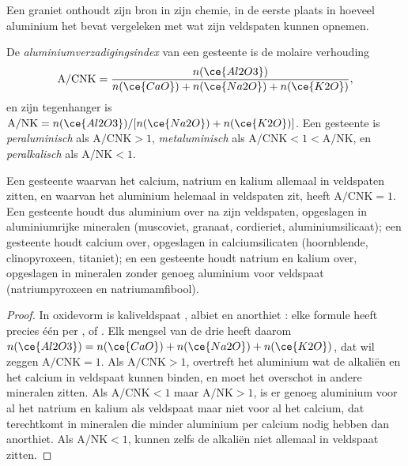 Een graniet onthoudt zijn bron in zijn chemie, in de eerste plaats in hoeveel aluminium het
bevat vergeleken met wat zijn veldspaten kunnen opnemen.

\begin{definition}[Aluminiumverzadigingsindex]\label{def:b2:crustal-melting:asi}
De \emph{aluminiumverzadigingsindex} van een gesteente is de
molaire verhouding
\[\mathrm{A/CNK} = \frac{n(\ce{Al2O3})}{n(\ce{CaO}) + n(\ce{Na2O}) + n(\ce{K2O})},\]
en zijn tegenhanger is $\mathrm{A/NK} = n(\ce{Al2O3})/[n(\ce{Na2O}) + n(\ce{K2O})]$. Een gesteente
is \emph{peraluminisch} als $\mathrm{A/CNK} > 1$,
\emph{metaluminisch} als $\mathrm{A/CNK} < 1 < \mathrm{A/NK}$, en
\emph{peralkalisch} als $\mathrm{A/NK} < 1$.
\end{definition}

\begin{proposition}\label{prop:b2:crustal-melting:feldspar}
Een gesteente waarvan het calcium, natrium en kalium allemaal in veldspaten zitten, en waarvan het aluminium
helemaal in veldspaten zit, heeft $\mathrm{A/CNK} = 1$. Een  gesteente houdt dus aluminium
over na zijn veldspaten, opgeslagen in aluminiumrijke mineralen (muscoviet, granaat, cordieriet,
aluminiumsilicaat); een  gesteente houdt calcium over, opgeslagen in calciumsilicaten
(hoornblende, clinopyroxeen, titaniet); en een  gesteente houdt natrium en kalium
over, opgeslagen in mineralen zonder genoeg aluminium voor veldspaat (natriumpyroxeen en
natriumamfibool).
\end{proposition}

\begin{proof}
In oxidevorm is kaliveldspaat , albiet  en
anorthiet : elke formule heeft precies één  per
,  of . Elk mengsel van de drie heeft daarom $n(\ce{Al2O3}) =
n(\ce{CaO}) + n(\ce{Na2O}) + n(\ce{K2O})$, dat wil zeggen $\mathrm{A/CNK} = 1$. Als
$\mathrm{A/CNK} > 1$, overtreft het aluminium wat de alkaliën en het calcium in
veldspaat kunnen binden, en moet het overschot in andere mineralen zitten. Als $\mathrm{A/CNK} < 1$ maar
$\mathrm{A/NK} > 1$, is er genoeg aluminium voor al het natrium en kalium als
veldspaat maar niet voor al het calcium, dat terechtkomt in mineralen die minder aluminium
per calcium nodig hebben dan anorthiet. Als $\mathrm{A/NK} < 1$, kunnen zelfs de alkaliën niet allemaal in
veldspaat zitten.
\end{proof}

